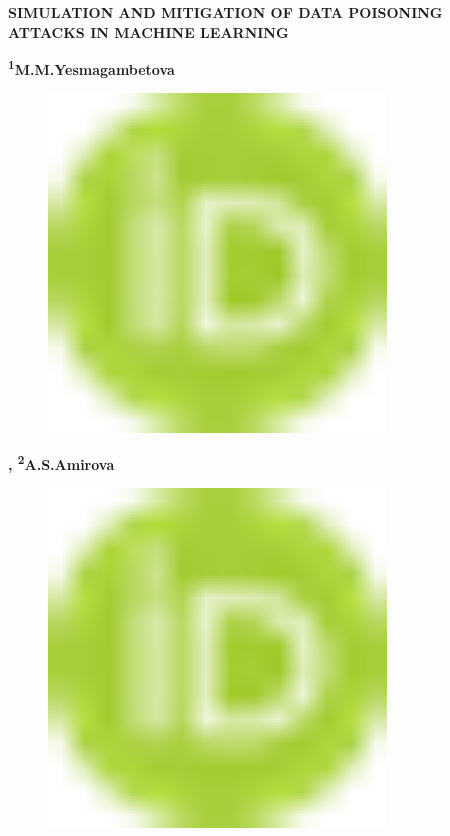 
{\bfseries SIMULATION AND MITIGATION OF DATA POISONING ATTACKS IN MACHINE
LEARNING}

{\bfseries \textsuperscript{1}M.M.Yesmagambetova}
\begin{figure}[H]
	\centering
	\includegraphics[width=0.8\textwidth]{media/ict2/image1}
	\caption*{}
\end{figure}
{\bfseries ,
\textsuperscript{2}A.S.Amirova}
\begin{figure}[H]
	\centering
	\includegraphics[width=0.8\textwidth]{media/ict2/image1}
	\caption*{}
\end{figure}
